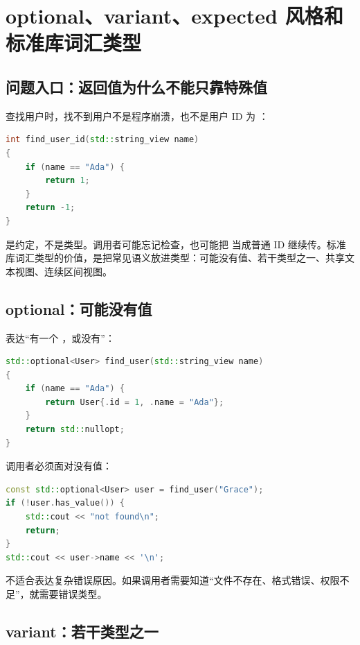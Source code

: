 \chapter{optional、variant、expected 风格和标准库词汇类型}

\section{问题入口：返回值为什么不能只靠特殊值}

查找用户时，找不到用户不是程序崩溃，也不是用户 ID 为 ：

\begin{lstlisting}[language=C++,caption={特殊值会污染语义}]
int find_user_id(std::string_view name)
{
    if (name == "Ada") {
        return 1;
    }
    return -1;
}
\end{lstlisting}

 是约定，不是类型。调用者可能忘记检查，也可能把  当成普通 ID 继续传。标准库词汇类型的价值，是把常见语义放进类型：可能没有值、若干类型之一、共享文本视图、连续区间视图。

\section{optional：可能没有值}

 表达“有一个 ，或没有”：

\begin{lstlisting}[language=C++,caption={optional 表达查找结果}]
std::optional<User> find_user(std::string_view name)
{
    if (name == "Ada") {
        return User{.id = 1, .name = "Ada"};
    }
    return std::nullopt;
}
\end{lstlisting}

调用者必须面对没有值：

\begin{lstlisting}[language=C++,caption={检查 optional}]
const std::optional<User> user = find_user("Grace");
if (!user.has_value()) {
    std::cout << "not found\n";
    return;
}
std::cout << user->name << '\n';
\end{lstlisting}

 不适合表达复杂错误原因。如果调用者需要知道“文件不存在、格式错误、权限不足”，就需要错误类型。

\section{variant：若干类型之一}

